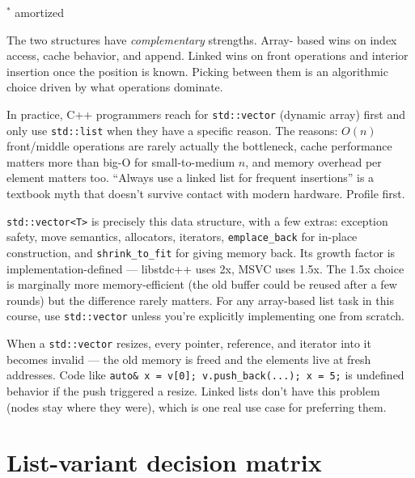 \documentclass[11pt]{article}
\begin{document}
\noindent $^*$ amortized

The two structures have \emph{complementary} strengths. Array-
based wins on index access, cache behavior, and append. Linked
wins on front operations and interior insertion once the position
is known. Picking between them is an algorithmic choice driven
by what operations dominate.

\begin{ideabox}
In practice, C++ programmers reach for \texttt{std::vector}
(dynamic array) first and only use \texttt{std::list} when they
have a specific reason. The reasons: $O(n)$ front/middle
operations are rarely actually the bottleneck, cache performance
matters more than big-O for small-to-medium $n$, and memory
overhead per element matters too. ``Always use a linked list for
frequent insertions'' is a textbook myth that doesn't survive
contact with modern hardware. Profile first.
\end{ideabox}

\begin{notebox}
\texttt{std::vector<T>} is precisely this data structure, with a
few extras: exception safety, move semantics, allocators,
iterators, \texttt{emplace\_back} for in-place construction, and
\texttt{shrink\_to\_fit} for giving memory back. Its growth
factor is implementation-defined --- libstdc++ uses 2x, MSVC
uses 1.5x. The 1.5x choice is marginally more memory-efficient
(the old buffer could be reused after a few rounds) but the
difference rarely matters. For any array-based list task in this
course, use \texttt{std::vector} unless you're explicitly
implementing one from scratch.
\end{notebox}

\begin{warnbox}
When a \texttt{std::vector} resizes, every pointer, reference,
and iterator into it becomes invalid --- the old memory is freed
and the elements live at fresh addresses. Code like
\texttt{auto\& x = v[0]; v.push\_back(...); x = 5;} is
undefined behavior if the push triggered a resize. Linked lists
don't have this problem (nodes stay where they were), which is
one real use case for preferring them.
\end{warnbox}

\section*{List-variant decision matrix}
\end{document}
